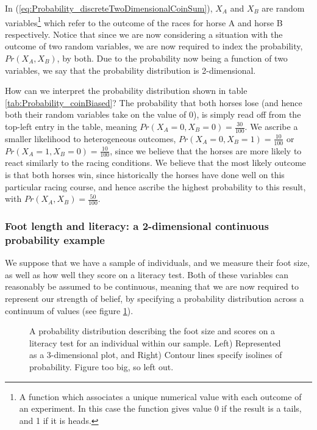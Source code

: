 \documentclass[11pt,fullpage]{book}
\begin{document}
In (\ref{eq:Probability_discreteTwoDimensionalCoinSum}), $X_A$ and $X_B$ are random variables\footnote{A function which associates a unique numerical value with each outcome of an experiment. In this case the function gives value 0 if the result is a tails, and 1 if it is heads.} which refer to the outcome of the races for horse A and horse B respectively. Notice that since we are now considering a situation with the outcome of two random variables, we are now required to index the probability, $Pr(X_A,X_B)$, by both. Due to the probability now being a function of two variables, we say that the probability distribution is 2-dimensional.

How can we interpret the probability distribution shown in table \ref{tab:Probability_coinBiased}? The probability that both horses lose (and hence both their random variables take on the value of 0), is simply read off from the top-left entry in the table, meaning $Pr(X_A=0,X_B=0)=\frac{30}{100}$. We ascribe a smaller likelihood to heterogeneous outcomes, $Pr(X_A=0,X_B=1)=\frac{10}{100}$ or $Pr(X_A=1,X_B=0)=\frac{10}{100}$, since we believe that the horses are more likely to react similarly to the racing conditions. We believe that the most likely outcome is that both horses win, since historically the horses have done well on this particular racing course, and hence ascribe the highest probability to this result, with $Pr(X_A,X_B)=\frac{50}{100}$.

\subsubsection{Foot length and literacy: a 2-dimensional continuous probability example}
We suppose that we have a sample of individuals, and we measure their foot size, as well as how well they score on a literacy test. Both of these variables can reasonably be assumed to be continuous, meaning that we are now required to represent our strength of belief, by specifying a probability distribution across a continuum of values (see figure \ref{fig:Probability_footSizeIntelligenceTwoDimensionalExample}). 

\begin{figure}
\centering
\scalebox{0.5} 
\caption{A probability distribution describing the foot size and scores on a literacy test for an individual within our sample. Left) Represented as a 3-dimensional plot, and Right) Contour lines specify isolines of probability. Figure too big, so left out.}\label{fig:Probability_footSizeIntelligenceTwoDimensionalExample}
\end{figure}
\end{document}
